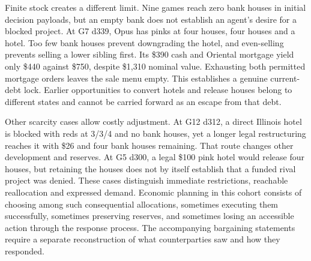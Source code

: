 Finite stock creates a different limit. Nine games reach zero bank houses in initial decision payloads, but an empty bank does not establish an agent's desire for a blocked project. At G7 d339, Opus has pinks at four houses, four houses and a hotel. Too few bank houses prevent downgrading the hotel, and even-selling prevents selling a lower sibling first. Its \$390 cash and Oriental mortgage yield only \$440 against \$750, despite \$1,310 nominal value. Exhausting both permitted mortgage orders leaves the sale menu empty. This establishes a genuine current-debt lock. Earlier opportunities to convert hotels and release houses belong to different states and cannot be carried forward as an escape from that debt.

Other scarcity cases allow costly adjustment. At G12 d312, a direct Illinois hotel is blocked with reds at 3/3/4 and no bank houses, yet a longer legal restructuring reaches it with \$26 and four bank houses remaining. That route changes other development and reserves. At G5 d300, a legal \$100 pink hotel would release four houses, but retaining the houses does not by itself establish that a funded rival project was denied. These cases distinguish immediate restrictions, reachable reallocation and expressed demand. Economic planning in this cohort consists of choosing among such consequential allocations, sometimes executing them successfully, sometimes preserving reserves, and sometimes losing an accessible action through the response process. The accompanying bargaining statements require a separate reconstruction of what counterparties saw and how they responded.
